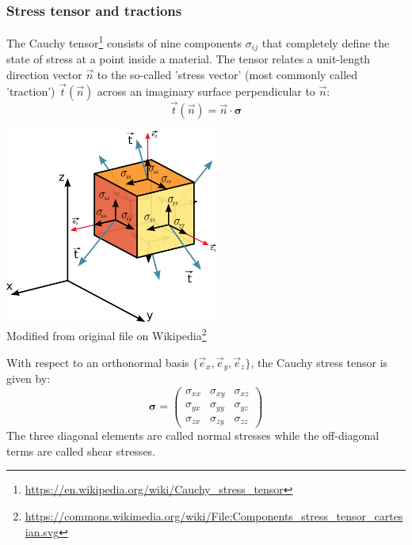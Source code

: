 \subsubsection{Stress tensor and tractions}\label{sec:stresstensor}

The Cauchy tensor\footnote{\url{https://en.wikipedia.org/wiki/Cauchy_stress_tensor}} 
consists of nine components $\sigma_{ij}$  that completely define the state of stress 
at a point inside a material. 
The tensor relates a unit-length direction vector $\vec{n}$ to the so-called 'stress vector' (most commonly called 'traction') $\vec{t}(\vec{n})$ across an imaginary surface perpendicular to $\vec{n}$:
\[
\vec{t}(\vec n)= {\vec n} \cdot {\bm \sigma}
\]

\begin{center}
\includegraphics[width=7cm]{images/contmech/Components_stress_tensor_cartesian}\\
{\scriptsize Modified from original 
file on Wikipedia\footnote{\url{https://commons.wikimedia.org/wiki/File:Components_stress_tensor_cartesian.svg}}}
\end{center}

With respect to an orthonormal basis $\{\vec{e}_x,\vec{e}_y,\vec{e}_z\}$, the Cauchy stress tensor
is given by:
\begin{equation}
{\bm \sigma}=
\left(
\begin{array}{ccc}
\sigma_{xx} & \sigma_{xy} & \sigma_{xz} \\
\sigma_{yx} & \sigma_{yy} & \sigma_{yz} \\
\sigma_{zx} & \sigma_{zy} & \sigma_{zz} 
\end{array}
\right)
\end{equation}
The three diagonal elements are called normal stresses while the off-diagonal terms 
are called shear stresses.

